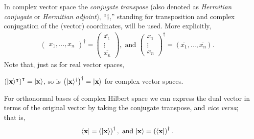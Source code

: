 In complex vector space the {\em conjugate transpose} (also denoted as
{\em Hermitian conjugate} or {\em Hermitian adjoint}),
``$\dagger$,'' standing for transposition and complex conjugation of the (vector) coordinates, will be used.
More explicitly,
\begin{equation}
\begin{split}
\begin{pmatrix}x_1,\ldots, x_n\end{pmatrix}^\dagger =
\begin{pmatrix}
\overline{x_1}\\ \vdots\\ \overline{x_n}
\end{pmatrix}
,  \textrm{ and }
\begin{pmatrix}
x_1\\ \vdots\\ x_n
\end{pmatrix}^\dagger
= (\overline{x_1},\ldots, \overline{x_n})
.
\end{split}
\end{equation}
Note that, just as for real vector spaces,

$\left(\vert {\bf x}\rangle^\intercal \right)^\intercal =\vert {\bf x}\rangle$,
 so is
$\left(\vert  {\bf x}\rangle ^\dagger \right)^\dagger= \vert{\bf x} \rangle$ for complex vector spaces.

For orthonormal bases of complex Hilbert space
we can express the dual vector in terms of the original vector by
taking the conjugate transpose, and {\em vice versa}; that is,
\begin{equation}
\begin{split}
\langle {\bf x} \vert = \left(\vert {\bf x}\rangle \right)^\dagger,
\textrm{ and }
\vert {\bf x}\rangle  = \left(\langle {\bf x}\vert\right)^\dagger.
\end{split}
\end{equation}

